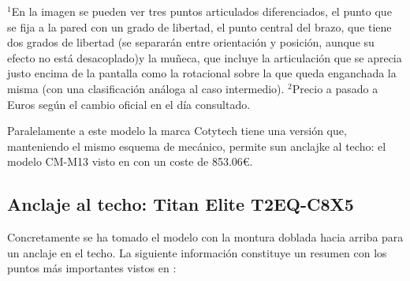\begin{center}
\begin{minipage}{1\textwidth}
	\footnotesize{$^1$En la imagen se pueden ver tres puntos articulados diferenciados, el punto que se fija a la pared con un grado de libertad, el punto central del brazo, que tiene dos grados de libertad (se separarán entre orientación y posición, aunque su efecto no está desacoplado)y la muñeca, que incluye la articulación que se aprecia justo encima de la pantalla como la rotacional sobre la que queda enganchada la misma (con una clasificación análoga al caso intermedio).}
    \footnotesize{$^2$Precio a pasado a Euros según el cambio oficial en el día consultado.}
\end{minipage}
\end{center}

 Paralelamente a este modelo la marca Cotytech tiene una versión que, manteniendo el mismo esquema de mecánico, permite sun anclajke al techo: el modelo CM-M13 visto en \cite{CotytechCMM13:2018} con un coste de 853.06\euro.
 \\


\subsection{Anclaje al techo: Titan Elite T2EQ-C8X5}

 Concretamente se ha tomado el modelo con la montura doblada hacia arriba para un anclaje en el techo. La siguiente información constituye un resumen con los puntos más importantes vistos en \cite{TitanElite:2018}:

